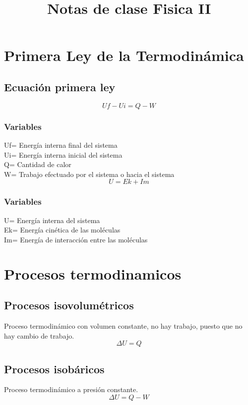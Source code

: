 \documentclass[12pt]{article}
\title{Notas de clase Fisica II}
\begin{document}
\maketitle
\section{Primera Ley de la Termodinámica}
\subsection{Ecuación primera ley}
\begin{equation}
Uf-Ui=Q-W
\end{equation}
\subsubsection{Variables}
Uf= Energía interna final del sistema\\
Ui= Energía interna inicial del sistema\\
Q= Cantidad de calor\\
W= Trabajo efectuado por el sistema o hacia el sistema\\

\begin{equation}
U=Ek+Im
\end{equation}
\subsubsection{Variables}
U= Energía interna del sistema\\
Ek= Energía cinética de las moléculas\\
Im= Energía de interacción entre las moléculas\\

\section{Procesos termodinamicos}
\subsection{Procesos isovolumétricos}
Proceso termodinámico con volumen constante, no hay trabajo, puesto que no hay cambio de trabajo.\\
\begin{equation}
 \Delta U=Q
\end{equation}
\subsection{Procesos isobáricos}
Proceso termodinámico a presión constante.
\begin{equation}
 \Delta U=Q-W
\end{equation}
\end{document}
